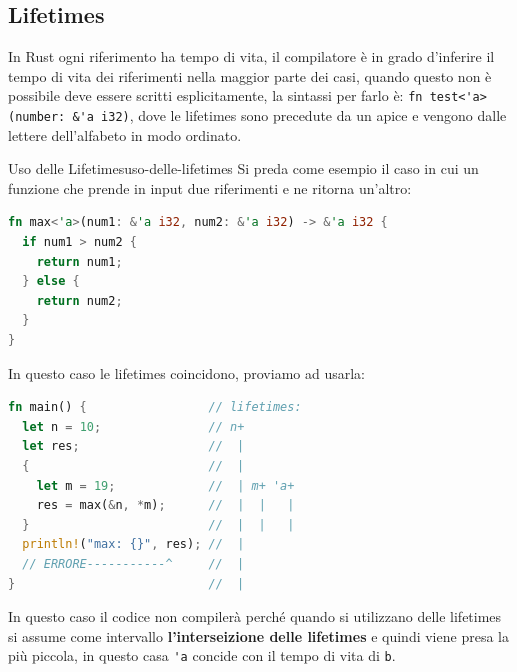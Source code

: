 \documentclass[12pt]{article}
\begin{document}
\subsection{Lifetimes}
In Rust ogni riferimento ha tempo di vita, il compilatore \`e in grado d'inferire il tempo di vita dei riferimenti nella maggior parte dei casi, quando questo non \`e possibile deve essere scritti esplicitamente, la sintassi per farlo \`e: \verb|fn test<'a>(number: &'a i32)|, dove le lifetimes sono precedute da un apice e vengono dalle lettere dell'alfabeto in modo ordinato.
\begin{example}{Uso delle Lifetimes}{uso-delle-lifetimes}
  Si preda come esempio il caso in cui un funzione che prende in input due riferimenti e ne ritorna un'altro:
  \begin{lstlisting}[language=rust]
fn max<'a>(num1: &'a i32, num2: &'a i32) -> &'a i32 {
  if num1 > num2 {
    return num1;
  } else {
    return num2;
  }
}
  \end{lstlisting}
  In questo caso le lifetimes coincidono, proviamo ad usarla:
  \begin{lstlisting}[language=rust]
fn main() {                 // lifetimes:
  let n = 10;               // n+
  let res;                  //  |      
  {                         //  |      
    let m = 19;             //  | m+ 'a+
    res = max(&n, *m);      //  |  |   |
  }                         //  |  |   |
  println!("max: {}", res); //  |      
  // ERRORE-----------^     //  |
}                           //  |
  \end{lstlisting}
  In questo caso il codice non compiler\`a perch\'e quando si utilizzano delle lifetimes si assume come intervallo \textbf{l'interseizione delle lifetimes} e quindi viene presa la pi\`u piccola, in questo casa \verb|'a| concide con il tempo di vita di \texttt{b}.
\end{example}
\end{document}
